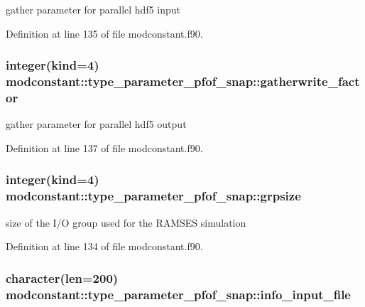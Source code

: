 gather parameter for parallel hdf5 input 



Definition at line 135 of file modconstant.\-f90.

\hypertarget{structmodconstant_1_1type__parameter__pfof__snap_afef04e15a6cc8639d9852b08b737927e}{
\subsubsection[{gatherwrite\-\_\-factor}]{\setlength{\rightskip}{0pt plus 5cm}integer(kind=4) modconstant\-::type\-\_\-parameter\-\_\-pfof\-\_\-snap\-::gatherwrite\-\_\-factor}}\label{structmodconstant_1_1type__parameter__pfof__snap_afef04e15a6cc8639d9852b08b737927e}


gather parameter for parallel hdf5 output 



Definition at line 137 of file modconstant.\-f90.

\hypertarget{structmodconstant_1_1type__parameter__pfof__snap_a65535bf9bcf3c053b3828d83e2f40271}{
\subsubsection[{grpsize}]{\setlength{\rightskip}{0pt plus 5cm}integer(kind=4) modconstant\-::type\-\_\-parameter\-\_\-pfof\-\_\-snap\-::grpsize}}\label{structmodconstant_1_1type__parameter__pfof__snap_a65535bf9bcf3c053b3828d83e2f40271}


size of the I/\-O group used for the R\-A\-M\-S\-E\-S simulation 



Definition at line 134 of file modconstant.\-f90.

\hypertarget{structmodconstant_1_1type__parameter__pfof__snap_a0337983bc6b424f1291afffd5f318eae}{
\subsubsection[{info\-\_\-input\-\_\-file}]{\setlength{\rightskip}{0pt plus 5cm}character(len=200) modconstant\-::type\-\_\-parameter\-\_\-pfof\-\_\-snap\-::info\-\_\-input\-\_\-file}}\label{structmodconstant_1_1type__parameter__pfof__snap_a0337983bc6b424f1291afffd5f318eae}


